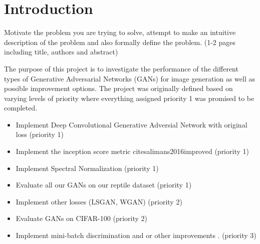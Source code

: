 \section{Introduction}
Motivate the problem you are trying to solve, attempt to make an intuitive description of the problem and also formally define the problem. (1-2 pages including title, authors and abstract)


 


The purpose of this project is to investigate the performance of the different types of Generative Adversarial Networks (GANs) \cite{goodfellow2014generative} for image generation as well as possible improvement options.
The project was originally defined based on varying levels of priority where everything assigned priority 1 was promised to be completed.

\begin{itemize}
	\item Implement Deep Convolutional Generative Adversial Network with original loss \cite{DBLP:journals/corr/RadfordMC15} (priority 1)
	\item Implement the inception score metric cite{salimans2016improved} (priority 1)
	\item Implement Spectral Normalization (priority 1)
	\item Evaluate all our GANs on our reptile dataset (priority 1)
	\item Implement other losses (LSGAN, WGAN) \cite{mao2017least} (priority 2)
	\item Evaluate GANs on CIFAR-100 (priority 2)
	\item Implement mini-batch discrimination and or other improvements \cite{salimans2016improved}. (priority 3)
\end{itemize}

